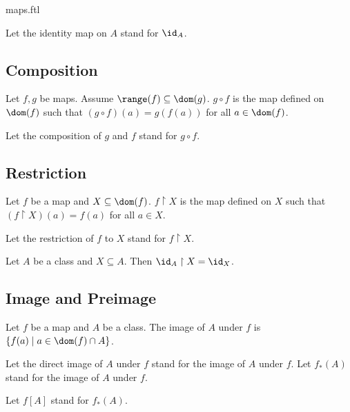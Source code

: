 \documentclass{naproche-library}
\begin{document}
\begin{smodule}{maps.ftl}
\begin{definition}[forthel,id=FOUNDATIONS_06_1920902360989696,printid]
    Let the identity map on $A$ stand for $\id_{A}$.
  \end{definition}


  \subsection*{Composition}

  \begin{definition}[forthel,id=FOUNDATIONS_06_7605717729017856,printid]
    Let $f, g$ be maps.
    Assume $\range(f) \subseteq \dom(g)$.
    $g \circ f$ is the map defined on $\dom(f)$ such that $(g \circ f)(a) = g(f(a))$ for all $a \in \dom(f)$.

    Let the composition of $g$ and $f$ stand for $g \circ f$.
  \end{definition}


  \subsection*{Restriction}

  \begin{definition}[forthel,id=FOUNDATIONS_06_7095412741636096,printid]
    Let $f$ be a map and $X \subseteq \dom(f)$.
    $f \restriction X$ is the map defined on $X$ such that $(f \restriction X)(a) = f(a)$ for all $a \in X$.

    Let the restriction of $f$ to $X$ stand for $f \restriction X$.
  \end{definition}

  \begin{proposition}[forthel,id=FOUNDATIONS_06_2170189258948608,printid]
    Let $A$ be a class and $X \subseteq A$.
    Then $\id_{A} \restriction X = \id_{X}$.
  \end{proposition}


  \subsection*{Image and Preimage}

  \begin{definition}[forthel,id=FOUNDATIONS_06_3038237683613696,printid]
    Let $f$ be a map and $A$ be a class.
    The image of $A$ under $f$ is $\{ f(a) \mid a \in \dom(f) \cap A \}$.

    Let the direct image of $A$ under $f$ stand for the image of $A$ under $f$.
    Let $f_{*}(A)$ stand for the image of $A$ under $f$.

    Let $f[A]$ stand for $f_{*}(A)$.
  \end{definition}


\end{smodule}
\end{document}
